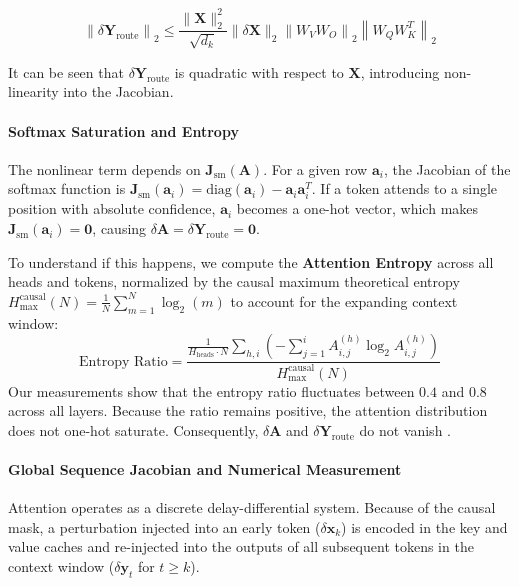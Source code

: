 \documentclass[a4paper,12pt]{article}
\begin{document}
    \begin{equation}
        \left\| \delta \mathbf{Y}_{\text{route}} \right\|_2 \le \frac{\|\mathbf{X}\|_2^2}{\sqrt{d_k}} \|\delta \mathbf{X}\|_2 \left\|W_V W_O\right\|_2 \left\|W_Q W_K^T\right\|_2
    \end{equation}

    It can be seen that $\delta \mathbf{Y}_{\text{route}}$ is quadratic with respect to $\mathbf{X}$, introducing non-linearity into the Jacobian.

    \paragraph{Softmax Saturation and Entropy}
    The nonlinear term depends on $\mathbf{J}_{\text{sm}}(\mathbf{A})$. For a given row $\mathbf{a}_i$, the Jacobian of the softmax function is $\mathbf{J}_{\text{sm}}(\mathbf{a}_i) = \text{diag}(\mathbf{a}_i) - \mathbf{a}_i \mathbf{a}_i^T$. If a token attends to a single position with absolute confidence, $\mathbf{a}_i$ becomes a one-hot vector, which makes $\mathbf{J}_{\text{sm}}(\mathbf{a}_i) = \mathbf{0}$, causing $\delta \mathbf{A} = \delta \mathbf{Y}_{\text{route}}  = \mathbf{0}$.

    To understand if this happens, we compute the \textbf{Attention Entropy} across all heads and tokens, normalized by the causal maximum theoretical entropy $H_{\max}^{\text{causal}}(N) = \frac{1}{N} \sum_{m=1}^N \log_2(m)$ to account for the expanding context window:
    \begin{equation}
        \text{Entropy Ratio} = \frac{\frac{1}{H_{\text{heads}} \cdot N} \sum_{h,i} \left( - \sum_{j=1}^{i} A_{i,j}^{(h)} \log_2 A_{i,j}^{(h)} \right)}{H_{\max}^{\text{causal}}(N)}
    \end{equation}
    Our measurements show that the entropy ratio fluctuates between $0.4$ and $0.8$ across all layers. Because the ratio remains positive, the attention distribution does not one-hot saturate. Consequently, $\delta \mathbf{A}$ and $\delta \mathbf{Y}_{\text{route}}$ do not vanish \cite{emadi2026exactattentionsensitivitygeometry}.

    \paragraph{Global Sequence Jacobian and Numerical Measurement}
    Attention operates as a discrete delay-differential system. Because of the causal mask, a perturbation injected into an early token ($\delta \mathbf{x}_k$) is encoded in the key and value caches and re-injected into the outputs of all subsequent tokens in the context window ($\delta \mathbf{y}_t$ for $t \ge k$). 
\end{document}
